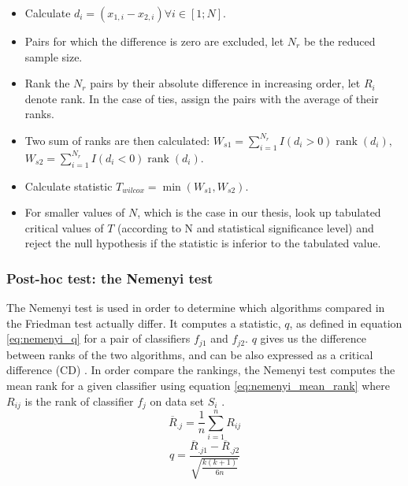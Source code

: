 \begin{itemize}
\item Calculate $d_i = (x_{1, i} - x_{2, i}) \forall i\in[1;N]$.
\item Pairs for which the difference is zero are excluded, let $N_r$ be the reduced sample size.
\item Rank the $N_r$ pairs by their absolute difference in increasing order, let $R_i$ denote rank. In the case of ties, assign the pairs with the average of their ranks.
\item Two sum of ranks are then calculated: 
\newline$W_{s 1}=\sum_{i=1}^{N_r} I(d_{i}>0) \operatorname{rank}(d_{i}),$ 
\newline$W_{s 2}=\sum_{i=1}^{N_r} I(d_{i}<0) \operatorname{rank}(d_{i})$.
\item Calculate statistic $T_{wilcox}=\min(W_{s 1}, W_{s 2})$.
\item For smaller values of $N$, which is the case in our thesis, look up tabulated critical values of $T$ (according to N and statistical significance level) and reject the null hypothesis if the statistic is inferior to the tabulated value.
\end{itemize}



\subsubsection{Post-hoc test: the Nemenyi test}
The Nemenyi test \cite{nemenyi1962distribution} is used in order to determine which algorithms compared in the Friedman test actually differ. It computes a statistic, $q$, as defined in equation \ref{eq:nemenyi_q} for a pair of classifiers $f_{j1}$ and $f_{j2}$. $q$ gives us the difference between ranks of the two algorithms, and can be also expressed as a critical difference (CD) \cite[356]{flach2012ml}. In order compare the rankings, the Nemenyi test computes the mean rank for a given classifier using equation \ref{eq:nemenyi_mean_rank} where $R_{ij}$ is the rank of classifier $f_j$ on data set $S_i$ \cite[256-257]{japkowicz2011evaluating}.
\begin{equation}
\label{eq:nemenyi_q}
\overline{R}_{.j}=\frac{1}{n}\sum_{i=1}^nR_{ij}
\end{equation}\begin{equation}
\label{eq:nemenyi_mean_rank}
q=\frac{\overline{R}_{.j1}-\overline{R}_{.j2}}{\sqrt{\frac{k(k+1)}{6n}}}
\end{equation}

